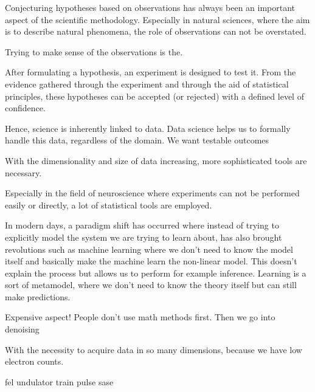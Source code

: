 Conjecturing hypotheses based on observations has always been an important aspect of the scientific methodology. Especially in natural sciences, where the aim is to describe natural phenomena, the role of observations can not be overstated. 


Trying to make sense of the observations is the.

After formulating a hypothesis, an experiment is designed to test it. From the evidence gathered through the experiment and through the aid of statistical principles, these hypotheses can be accepted (or rejected) with a defined level of confidence.

Hence, science is inherently linked to data. Data science helps us to formally handle this data, regardless of the domain. We want testable outcomes

With the dimensionality and size of data increasing, more sophisticated tools are necessary. 

Especially in the field of neuroscience where experiments can not be performed easily or directly, a lot of statistical tools are employed.

In modern days, a paradigm shift has occurred where instead of trying to explicitly model the system we are trying to learn about, 
has also brought revolutions such as machine learning where we don't need to know the model itself and basically make the machine learn the non-linear model. This doesn't explain the process but allows us to perform for example inference. Learning is a sort of metamodel, where we don't need to know the theory itself but can still make predictions.


Expensive aspect! People don't use math methods first.
Then we go into denoising 

With the necessity to acquire data in so many dimensions, because we have low electron counts.

\gls{fel} \gls{undulator} \gls{train} \gls{pulse} \gls{sase}